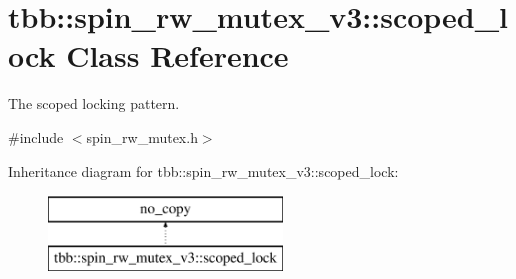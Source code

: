 \hypertarget{classtbb_1_1spin__rw__mutex__v3_1_1scoped__lock}{}\section{tbb\+:\+:spin\+\_\+rw\+\_\+mutex\+\_\+v3\+:\+:scoped\+\_\+lock Class Reference}
\label{classtbb_1_1spin__rw__mutex__v3_1_1scoped__lock}


The scoped locking pattern.  




{\ttfamily \#include $<$spin\+\_\+rw\+\_\+mutex.\+h$>$}

Inheritance diagram for tbb\+:\+:spin\+\_\+rw\+\_\+mutex\+\_\+v3\+:\+:scoped\+\_\+lock\+:\begin{figure}[H]
\begin{center}
\leavevmode
\includegraphics[height=2.000000cm]{classtbb_1_1spin__rw__mutex__v3_1_1scoped__lock}
\end{center}
\end{figure}
